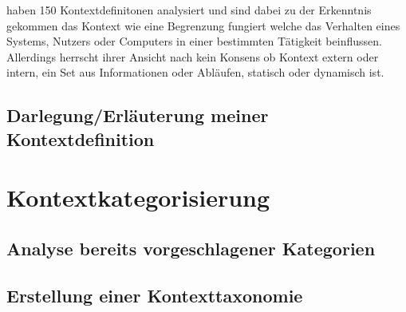 \cite{hutchison_understanding_2005} haben 150 Kontextdefinitonen analysiert und sind dabei zu der Erkenntnis gekommen das Kontext wie eine Begrenzung fungiert welche das Verhalten eines Systems, Nutzers oder Computers in einer bestimmten Tätigkeit beinflussen. Allerdings herrscht ihrer Ansicht nach kein Konsens ob Kontext extern oder intern, ein Set aus Informationen oder Abläufen, statisch oder dynamisch ist.


\cite{kokinov_operational_2007}





\subsection{Darlegung/Erläuterung meiner Kontextdefinition}

\section{Kontextkategorisierung}

		\subsection{ Analyse bereits vorgeschlagener Kategorien} 
		\subsection{ Erstellung einer Kontexttaxonomie }

